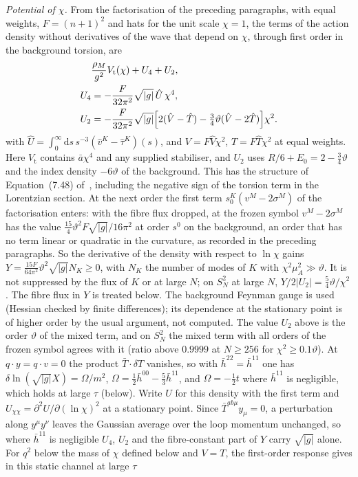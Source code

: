 \emph{Potential of \(\chi\).} From the factorisation of the preceding paragraphs, with equal weights, \(F=(n+1)^2\) and hats for the unit scale \(\chi=1\), the terms of the action density without derivatives of the wave that depend on \(\chi\), through first order in the background torsion, are
\[
\begin{aligned}
  &\frac{\rho_M}{g^2}V_{\mathrm t}(\chi)+U_4+U_2,\\
  U_4
  &= -\frac{F}{32\pi^2}\sqrt{|g|}\,\hat U\,\chi^4,\\
  U_2
  &= -\frac{F}{32\pi^2}\sqrt{|g|}
     \Bigl[2(\hat V-\hat T)-\tfrac34\vartheta(\hat V-2\hat T)\Bigr]\chi^2.
\end{aligned}
\]
with \(\hat U=\int_0^\infty\mathrm ds\,s^{-3}(\hat v^K-\hat\tau^K)(s)\), and \(V=F\hat V\chi^2\), \(T=F\hat T\chi^2\) at equal weights. Here \(V_{\mathrm t}\) contains \(\bar a\chi^4\) and any supplied stabiliser, and \(U_2\) uses \(R/6+E_0=2-\tfrac34\vartheta\) and the index density \(-6\vartheta\) of the background. This has the structure of Equation~(7.48) of~\cite{Steinacker2023}, including the negative sign of the torsion term in the Lorentzian section. At the next order the first term \(s_0^K(v^M-2\sigma^M)\) of the factorisation enters: with the fibre flux dropped, at the frozen symbol \(v^M-2\sigma^M\) has the value \(\tfrac{15}{4}\vartheta^2F\sqrt{|g|}/16\pi^2\) at order \(s^0\) on the background, an order that has no term linear or quadratic in the curvature, as recorded in the preceding paragraphs. So the derivative of the density with respect to \(\ln\chi\) gains \(Y=\tfrac{15F}{64\pi^2}\vartheta^2\sqrt{|g|}N_K\ge0\), with \(N_K\) the number of modes of \(K\) with \(\chi^2\mu_A^2\gg\vartheta\). It is not suppressed by the flux of \(K\) or at large \(N\); on \(S^2_N\) at large \(N\), \(Y/2|U_2|=\tfrac54\vartheta/\chi^2\). The fibre flux in \(Y\) is treated below. The background Feynman gauge is used (Hessian checked by finite differences); its dependence at the stationary point is of higher order by the usual argument, not computed. The value \(U_2\) above is the order \(\vartheta\) of the mixed term, and on \(S^2_N\) the mixed term with all orders of the frozen symbol agrees with it (ratio above \(0.9999\) at \(N\ge256\) for \(\chi^2\ge0.1\vartheta\)). At \(q\cdot y=q\cdot v=0\) the product \(\bar T\cdot\delta T\) vanishes, so with \(\bar h^{22}=\bar h^{11}\) one has \(\delta\ln(\sqrt{|g|}X)=\Omega/m^2\), \(\Omega=\tfrac12\bar h^{00}-\tfrac53\bar h^{11}\), and \(\Omega=-\tfrac12t\) where \(\bar h^{11}\) is negligible, which holds at large \(\tau\) (below). Write \(U\) for this density with the first term and \(U_{\chi\chi}=\partial^2U/\partial(\ln\chi)^2\) at a stationary point. Since \(\bar T^{ab\mu}y_\mu=0\), a perturbation along \(y^\mu y^\nu\) leaves the Gaussian average over the loop momentum unchanged, so where \(\bar h^{11}\) is negligible \(U_4\), \(U_2\) and the fibre-constant part of \(Y\) carry \(\sqrt{|g|}\) alone. For \(q^2\) below the mass of \(\chi\) defined below and \(V=T\), the first-order response gives in this static channel at large \(\tau\)
